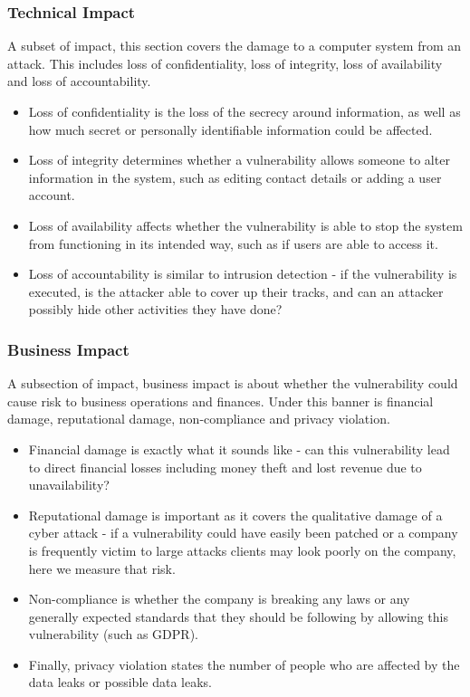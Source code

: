 \documentclass{report}
\begin{document}
\subsubsection{Technical Impact}
A subset of impact, this section covers the damage to a computer system from an attack. This includes loss of confidentiality, loss of integrity, loss of availability and loss of accountability. 
\begin{itemize}
	\item Loss of confidentiality is the loss of the secrecy around information, as well as how much secret or personally identifiable information could be affected.
	\item Loss of integrity determines whether a vulnerability allows someone to alter information in the system, such as editing contact details or adding a user account.
	\item Loss of availability affects whether the vulnerability is able to stop the system from functioning in its intended way, such as if users are able to access it.
	\item Loss of accountability is similar to intrusion detection - if the vulnerability is executed, is the attacker able to cover up their tracks, and can an attacker possibly hide other activities they have done?
\end{itemize}

\subsubsection{Business Impact}
A subsection of impact, business impact is about whether the vulnerability could cause risk to business operations and finances. Under this banner is financial damage, reputational damage, non-compliance and privacy violation. 
\begin{itemize}
	\item Financial damage is exactly what it sounds like - can this vulnerability lead to direct financial losses including money theft and lost revenue due to unavailability?
	\item Reputational damage is important as it covers the qualitative damage of a cyber attack - if a vulnerability could have easily been patched or a company is frequently victim to large attacks clients may look poorly on the company, here we measure that risk.
	\item Non-compliance is whether the company is breaking any laws or any generally expected standards that they should be following by allowing this vulnerability (such as GDPR).
	\item Finally, privacy violation states the number of people who are affected by the data leaks or possible data leaks.
\end{itemize}
\end{document}

